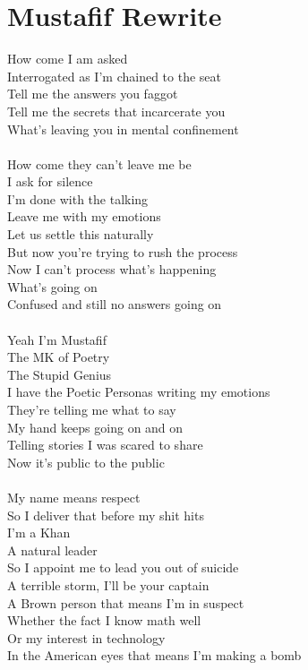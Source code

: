 \documentclass[12pt, b5paper, oneside]{book}
\begin{document}
\section{Mustafif Rewrite}
How come I am asked
\\Interrogated as I'm chained to the seat
\\Tell me the answers you faggot
\\Tell me the secrets that incarcerate you
\\What's leaving you in mental confinement
%
\\\\How come they can't leave me be
\\I ask for silence
\\I'm done with the talking
\\Leave me with my emotions
\\Let us settle this naturally
\\But now you're trying to rush the process
\\Now I can't process what's happening
\\What's going on
\\Confused and still no answers going on
%
\\\\Yeah I'm Mustafif
\\The MK of Poetry
\\The Stupid Genius
\\I have the Poetic Personas writing my emotions
\\They're telling me what to say
\\My hand keeps going on and on
\\Telling stories I was scared to share
\\Now it's public to the public
%
\\\\My name means respect
\\So I deliver that before my shit hits
\\I'm a Khan
\\A natural leader
\\So I appoint me to lead you out of suicide
\\A terrible storm, I'll be your captain
\\A Brown person that means I'm in suspect
\\Whether the fact I know math well
\\Or my interest in technology
\\In the American eyes that means I'm making a bomb
\end{document}
